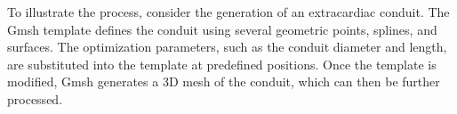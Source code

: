 To illustrate the process, consider the generation of an extracardiac conduit. The Gmsh template defines the conduit using several geometric points, splines, and surfaces. The optimization parameters, such as the conduit diameter and length, are substituted into the template at predefined positions. Once the template is modified, Gmsh generates a 3D mesh of the conduit, which can then be further processed.

